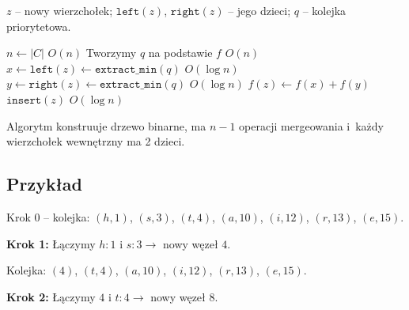 \documentclass[a4paper,11pt]{article}
\theoremstyle{definition}
\begin{document}
\bigskip

$z$ -- nowy wierzchołek; $\texttt{left}(z)$, $\texttt{right}(z)$ -- jego dzieci; $q$ -- kolejka priorytetowa.

\begin{algorithm}[H]
\caption{Algorytm Huffmana -- na wejściu $C$ i $f$}
\begin{algorithmic}[1]
\STATE $n \leftarrow |C|$ \hfill $O(n)$
\STATE Tworzymy $q$ na podstawie $f$ \hfill $O(n)$
    \STATE $x \leftarrow \texttt{left}(z) \leftarrow \texttt{extract\_min}(q)$ \hfill $O(\log n)$
    \STATE $y \leftarrow \texttt{right}(z) \leftarrow \texttt{extract\_min}(q)$ \hfill $O(\log n)$
    \STATE $f(z) \leftarrow f(x) + f(y)$
    \STATE $\texttt{insert}(z)$ \hfill $O(\log n)$
\ENDFOR
\end{algorithmic}
\end{algorithm}

Algorytm konstruuje drzewo binarne, ma $n - 1$ operacji mergeowania i~każdy wierzchołek wewnętrzny ma 2 dzieci.

\subsection{Przykład}

Krok 0 -- kolejka: $(h, 1)$, $(s, 3)$, $(t, 4)$, $(a, 10)$, $(i, 12)$, $(r, 13)$, $(e, 15)$.

\textbf{Krok 1:} Łączymy $h{:}1$ i $s{:}3 \to$ nowy węzeł $4$.

\begin{center}
\end{center}

Kolejka: $(4)$, $(t, 4)$, $(a, 10)$, $(i, 12)$, $(r, 13)$, $(e, 15)$.

\textbf{Krok 2:} Łączymy $4$ i $t{:}4 \to$ nowy węzeł $8$.

\begin{center}
\end{center}
\end{document}
